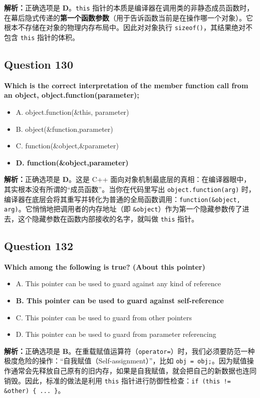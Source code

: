\documentclass[11pt, a4paper]{article}
\begin{document}
\textbf{解析：}正确选项是 \textbf{D}。\texttt{this} 指针的本质是编译器在调用类的非静态成员函数时，在幕后隐式传递的\textbf{第一个函数参数}（用于告诉函数当前是在操作哪一个对象）。它根本不存储在对象的物理内存布局中。因此对对象执行 \texttt{sizeof()}，其结果绝对不包含 \texttt{this} 指针的体积。

\subsection*{Question 130}
\textbf{Which is the correct interpretation of the member function call from an object, object.function(parameter);}
\begin{itemize}
    \item A. object.function(\&this, parameter)
    \item B. object(\&function,parameter)
    \item C. function(\&object,\&parameter)
    \item \textbf{D. function(\&object,parameter)}
\end{itemize}

\textbf{解析：}正确选项是 \textbf{D}。这是 C++ 面向对象机制最底层的真相：在编译器眼中，其实根本没有所谓的“成员函数”。当你在代码里写出 \texttt{object.function(arg)} 时，编译器在底层会将其重写并转化为普通的全局函数调用：\texttt{function(\&object, arg)}。它悄悄地把调用者的内存地址（即 \texttt{\&object}）作为第一个隐藏参数传了进去，这个隐藏参数在函数内部接收的名字，就叫做 \texttt{this} 指针。


\subsection*{Question 132}
\textbf{Which among the following is true? (About this pointer)}
\begin{itemize}
    \item A. This pointer can be used to guard against any kind of reference
    \item \textbf{B. This pointer can be used to guard against self-reference}
    \item C. This pointer can be used to guard from other pointers
    \item D. This pointer can be used to guard from parameter referencing
\end{itemize}

\textbf{解析：}正确选项是 \textbf{B}。在重载赋值运算符（\texttt{operator=}）时，我们必须要防范一种极度危险的操作：“自我赋值（Self-assignment）”，比如 \texttt{obj = obj;}。因为赋值操作通常会先释放自己原有的旧内存，如果是自我赋值，就会把自己的新数据也连同销毁。因此，标准的做法是利用 \texttt{this} 指针进行防御性检查：\texttt{if (this != \&other) \{ ... \}}。
\end{document}
